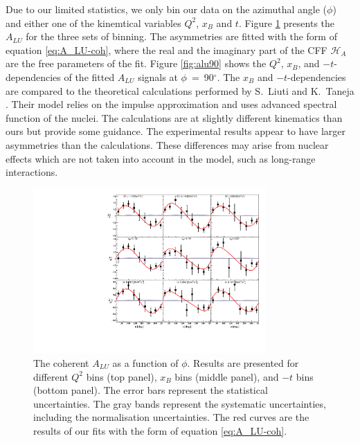\documentclass[nofootinbib,twocolumn,showpacs,prl,superscriptaddress,secnumarabic,amssymb,nobibnotes,aps,floatfix,preprint]{revtex4}
\begin{document}
Due to our limited statistics, we only bin  our data 
 on the azimuthal angle ($\phi$) and either one of the kinemtical variables 
$Q^{2}$, $x_{B}$ and $t$. Figure \ref{fig:alu} presents the $A_{LU}$ for the three
sets of binning. The asymmetries are fitted with the form of
equation \ref{eq:A_LU-coh}, where the real and the imaginary part of the CFF
$\mathcal{H}_{A}$ are the free parameters of the fit. Figure \ref{fig:alu90} 
shows the $Q^2$, $x_{B}$, and $-t$-dependencies of the fitted $A_{LU}$ signals 
at $\phi$~=~90$^{\circ}$. The $x_{B}$ and $-t$-dependencies are compared to 
the theoretical calculations performed by S.~Liuti and K.~Taneja 
\cite{simonetta_2}. Their model relies on the impulse approximation and uses 
advanced spectral function of the nuclei. The calculations are at slightly different 
kinematics than ours but provide some guidance. The experimental 
results appear to have larger asymmetries than the calculations. These 
differences may arise from nuclear effects which are not taken into account in 
the model, such as long-range interactions.

\begin{figure}[tb]
\includegraphics[width=8.9cm]{figs/coherent-ALU.pdf}
\caption{The coherent $A_{LU}$ as a function of $\phi$. Results are presented
   for different $Q^{2}$ bins (top panel), $x_{B}$ bins (middle panel), and 
   $-t$ bins (bottom panel).  
   The error bars represent the statistical uncertainties. The gray 
   bands represent the systematic uncertainties, including the normalisation 
   uncertainties. The red curves are the results of our fits with the form of 
   equation \ref{eq:A_LU-coh}.}
\label{fig:alu}
\end{figure}
\end{document}
